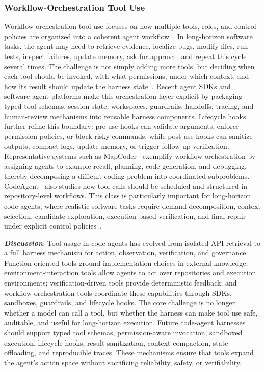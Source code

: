 \subsubsection{Workflow-Orchestration Tool Use}
Workflow-orchestration tool use focuses on how multiple tools, roles, and control policies are organized into a coherent agent workflow~\cite{xiong2025self,shi2025flowxpert,lumer2025tool, su2025toolorchestra}. In long-horizon software tasks, the agent may need to retrieve evidence, localize bugs, modify files, run tests, inspect failures, update memory, ask for approval, and repeat this cycle several times. The challenge is not simply adding more tools, but deciding when each tool should be invoked, with what permissions, under which context, and how its result should update the harness state~\cite{liu2024toolnet}. Recent agent SDKs and software-agent platforms make this orchestration layer explicit by packaging typed tool schemas, session state, workspaces, guardrails, handoffs, tracing, and human-review mechanisms into reusable harness components. Lifecycle hooks further refine this boundary: pre-use hooks can validate arguments, enforce permission policies, or block risky commands, while post-use hooks can sanitize outputs, compact logs, update memory, or trigger follow-up verification. Representative systems such as MapCoder~\cite{islam2024mapcoder} exemplify workflow orchestration by assigning agents to example recall, planning, code generation, and debugging, thereby decomposing a difficult coding problem into coordinated subproblems. CodeAgent~\cite{zhang2024codeagent} also studies how tool calls should be scheduled and structured in repository-level workflows. This class is particularly important for long-horizon code agents, where realistic software tasks require demand decomposition, context selection, candidate exploration, execution-based verification, and final repair under explicit control policies~\cite{liu2024toolnet,liu2024controlllm}.


\textbf{\textit{Discussion}}: Tool usage in code agents has evolved from isolated API retrieval to a full harness mechanism for action, observation, verification, and governance. Function-oriented tools ground implementation choices in external knowledge; environment-interaction tools allow agents to act over repositories and execution environments; verification-driven tools provide deterministic feedback; and workflow-orchestration tools coordinate these capabilities through SDKs, sandboxes, guardrails, and lifecycle hooks. The core challenge is no longer whether a model can call a tool, but whether the harness can make tool use safe, auditable, and useful for long-horizon execution. Future code-agent harnesses should support typed tool schemas, permission-aware invocation, sandboxed execution, lifecycle hooks, result sanitization, context compaction, state offloading, and reproducible traces. These mechanisms ensure that tools expand the agent's action space without sacrificing reliability, safety, or verifiability.
